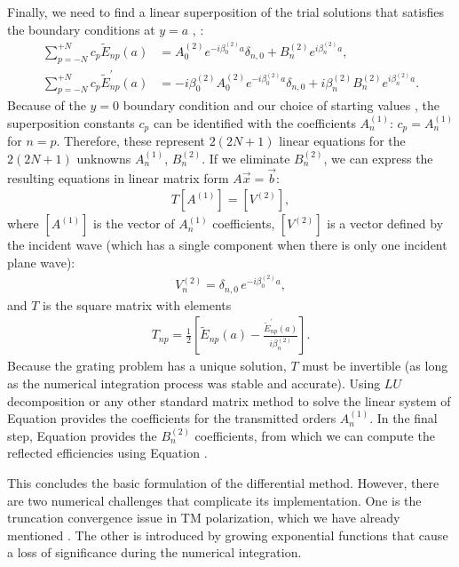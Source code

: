 Finally, we need to find a linear superposition of the trial solutions that satisfies the boundary conditions at $y=a$ , :
\begin{align}
\label{superposition1}
\sum \limits_{p=-N}^{+N} c_p \tilde E_{np}(a) &= A_0^{(2)} e^{-i \beta_0^{(2)} a} \delta_{n,0} + B_n^{(2)} e^{i \beta_n^{(2)}a}, \\
\sum \limits_{p=-N}^{+N} c_p \tilde E^\prime_{np}(a) &= -i \beta_0^{(2)} A_0^{(2)} e^{-i\beta_0^{(2)}a} \delta_{n,0} + i \beta_n^{(2)} B_n^{(2)} e^{i \beta_n^{(2)}a}.
\end{align}
Because of the $y=0$ boundary condition  and our choice of starting values , the superposition constants $c_p$ can be identified with the coefficients $A^{(1)}_n$: $c_p = A^{(1)}_n$ for $n=p$.  Therefore, these represent $2(2N+1)$ linear equations for the $2(2N+1)$ unknowns $A_n^{(1)}$, $B_n^{(2)}$.  If we eliminate $B_n^{(2)}$, we can express the resulting equations in linear matrix form $A \vec x = \vec b$:
\begin{align}
\label{axb}
T \left[A^{(1)}\right] = \left[V^{(2)}\right],
\end{align}
where $\left[A^{(1)}\right]$ is the vector of $A^{(1)}_n$ coefficients, $\left[V^{(2)}\right]$ is a vector defined by the incident wave (which has a single component when there is only one incident plane wave):
\begin{align}
V^{(2)}_n =  \delta_{n,0} \,e^{-i\beta^{(2)}_0 a},
\end{align}
and $T$ is the square matrix with elements
\begin{align}
T_{np}=   \frac{1}{2} \left[ \tilde E_{np}(a) - \frac{\tilde E^\prime_{np}(a)}{i\beta_n^{(2)}} \right].
\end{align}
Because the grating problem has a unique solution, $T$ must be invertible (as long as the numerical integration process was stable and accurate).  Using $LU$ decomposition or any other standard matrix method to solve the linear system of Equation  provides the coefficients for the transmitted orders $A_n^{(1)}$.  In the final step, Equation  provides the $B_n^{(2)}$ coefficients, from which we can compute the reflected efficiencies using Equation .

This concludes the basic formulation of the differential method.  However, there are two numerical challenges that complicate its implementation.  One is the truncation convergence issue in TM polarization, which we have already mentioned \cite{Li96b}.  The other is introduced by growing exponential functions that cause a loss of significance during the numerical integration.

